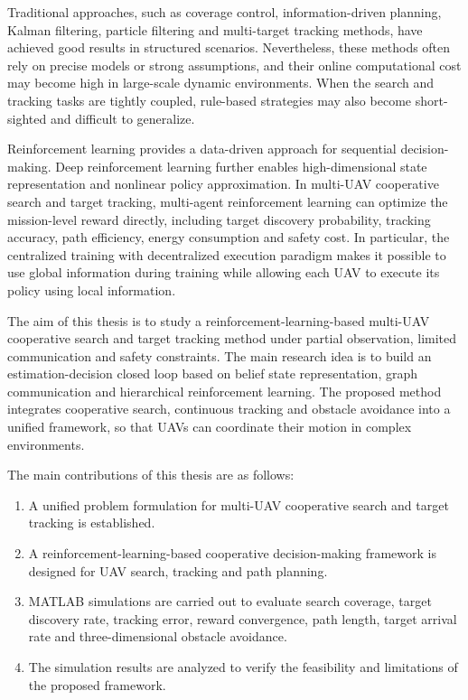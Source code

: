 \documentclass[14pt,a4paper]{extarticle}
\begin{document}
Traditional approaches, such as coverage control, information-driven planning, Kalman filtering, particle filtering and multi-target tracking methods, have achieved good results in structured scenarios. Nevertheless, these methods often rely on precise models or strong assumptions, and their online computational cost may become high in large-scale dynamic environments. When the search and tracking tasks are tightly coupled, rule-based strategies may also become short-sighted and difficult to generalize.

Reinforcement learning provides a data-driven approach for sequential decision-making. Deep reinforcement learning further enables high-dimensional state representation and nonlinear policy approximation. In multi-UAV cooperative search and target tracking, multi-agent reinforcement learning can optimize the mission-level reward directly, including target discovery probability, tracking accuracy, path efficiency, energy consumption and safety cost. In particular, the centralized training with decentralized execution paradigm makes it possible to use global information during training while allowing each UAV to execute its policy using local information.

The aim of this thesis is to study a reinforcement-learning-based multi-UAV cooperative search and target tracking method under partial observation, limited communication and safety constraints. The main research idea is to build an estimation-decision closed loop based on belief state representation, graph communication and hierarchical reinforcement learning. The proposed method integrates cooperative search, continuous tracking and obstacle avoidance into a unified framework, so that UAVs can coordinate their motion in complex environments.

The main contributions of this thesis are as follows:

\begin{enumerate}[label=\arabic*)]
  \item A unified problem formulation for multi-UAV cooperative search and target tracking is established.

  \item A reinforcement-learning-based cooperative decision-making framework is designed for UAV search, tracking and path planning.

  \item MATLAB simulations are carried out to evaluate search coverage, target discovery rate, tracking error, reward convergence, path length, target arrival rate and three-dimensional obstacle avoidance.

  \item The simulation results are analyzed to verify the feasibility and limitations of the proposed framework.
\end{enumerate}
\end{document}
